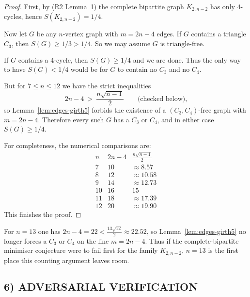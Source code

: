 \begin{proof}
First, by (R2 Lemma~1) the complete bipartite graph $K_{2,n-2}$ has only $4$-cycles, hence
$S(K_{2,n-2})=1/4$.

Now let $G$ be any $n$-vertex graph with $m=2n-4$ edges.
If $G$ contains a triangle $C_3$, then $S(G)\ge 1/3>1/4$.
So we may assume $G$ is triangle-free.

If $G$ contains a $4$-cycle, then $S(G)\ge 1/4$ and we are done.
Thus the only way to have $S(G)<1/4$ would be for $G$ to contain no $C_3$ and no $C_4$.

But for $7\le n\le 12$ we have the strict inequalities
\[
2n-4\ >\ \frac{n\sqrt{n-1}}{2}
\qquad\text{(checked below),}
\]
so Lemma~\ref{lem:edges-girth5} forbids the existence of a $(C_3,C_4)$-free graph with $m=2n-4$.
Therefore every such $G$ has a $C_3$ or $C_4$, and in either case $S(G)\ge 1/4$.

For completeness, the numerical comparisons are:
\[
\begin{array}{c|c|c}
 n & 2n-4 & \tfrac{n\sqrt{n-1}}{2}\\\hline
 7 & 10 & \approx 8.57\\
 8 & 12 & \approx 10.58\\
 9 & 14 & \approx 12.73\\
 10 & 16 & 15\\
 11 & 18 & \approx 17.39\\
 12 & 20 & \approx 19.90
\end{array}
\]
This finishes the proof.
\end{proof}

\begin{remark}
For $n=13$ one has $2n-4=22<\tfrac{13\sqrt{12}}{2}\approx 22.52$, so Lemma~\ref{lem:edges-girth5} no longer
forces a $C_3$ or $C_4$ on the line $m=2n-4$. Thus if the complete-bipartite minimiser conjecture were to fail
first for the family $K_{2,n-2}$, $n=13$ is the first place this counting argument leaves room.
\end{remark}

\subsection{6) ADVERSARIAL VERIFICATION}

